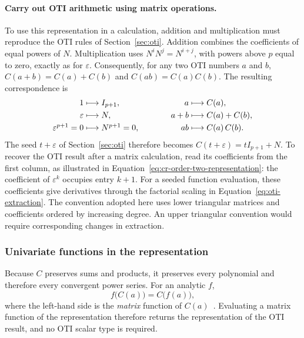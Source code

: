 \documentclass[10pt]{article}
\begin{document}
\paragraph{Carry out OTI arithmetic using matrix operations.}
To use this representation in a calculation, addition and multiplication
must reproduce the OTI rules of Section~\ref{sec:oti}. Addition combines
the coefficients of equal powers of $N$. Multiplication uses
$N^iN^j=N^{i+j}$, with powers above $p$ equal to zero, exactly as for
$\varepsilon$. Consequently, for any two OTI numbers $a$ and $b$,
$C(a+b)=C(a)+C(b)$ and $C(ab)=C(a)C(b)$.
The resulting correspondence is
\begin{equation}
\label{eq:cr-dictionary}
\begin{array}{r@{\;}c@{\;}l@{\qquad\qquad}r@{\;}c@{\;}l}
 1 &\longmapsto& I_{p+1},
 & a &\longmapsto& C(a),\\[3pt]
 \varepsilon &\longmapsto& N,
 & a+b &\longmapsto& C(a)+C(b),\\[3pt]
 \varepsilon^{p+1}=0 &\longmapsto& N^{p+1}=0,
 & ab &\longmapsto& C(a)\,C(b).
\end{array}
\end{equation}
The seed $t+\varepsilon$ of Section~\ref{sec:oti} therefore becomes
$C(t+\varepsilon)=tI_{p+1}+N$. To recover the OTI result after a matrix
calculation, read its coefficients from the first column, as illustrated
in Equation~\eqref{eq:cr-order-two-representation}: the coefficient of
$\varepsilon^k$ occupies entry $k+1$. For a seeded function evaluation,
these coefficients give derivatives through the factorial scaling in
Equation~\eqref{eq:oti-extraction}.
The convention adopted here uses lower triangular matrices
and coefficients ordered by increasing degree. An upper triangular convention
would require corresponding changes in extraction.

\subsubsection{Univariate functions in the representation}
\label{sec:cr-univariate}
Because $C$ preserves sums and products, it preserves every polynomial and
therefore every convergent power series. For an analytic $f$,
\begin{equation}
\label{eq:cr-homomorphism}
 f\bigl(C(a)\bigr)=C\bigl(f(a)\bigr),
\end{equation}
where the left-hand side is the \emph{matrix} function of
$C(a)$~\cite{higham2008}. Evaluating a matrix function of the representation therefore returns the
representation of the OTI result, and no OTI scalar type is required.
\end{document}
